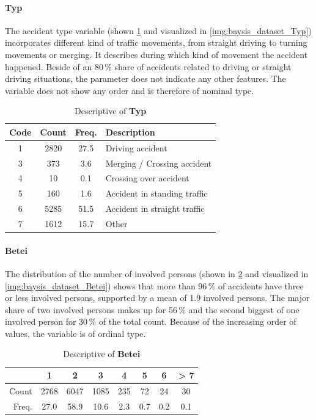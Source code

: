\paragraph{Typ}
\label{baysis_dataset_Typ}
The accident type variable (shown \cref{tbl:baysis_dataset_Typ} and visualized in \cref{img:baysis_dataset_Typ}) incorporates different kind of traffic movements, from straight driving to turning movements or merging. It describes during which kind of movement the accident happened. Beside of an 80\,\% share of accidents related to driving or straight driving situations, the parameter does not indicate any other features. The variable does not show any order and is therefore of nominal type.
\begin{table}[!ht]
	\centering
	\small
	\begin{tabular}{c|c|c|l} 
		\toprule
		Code & Count & Freq. & Description \\ 
		\midrule
 		1 & 2820	& 27.5	& Driving accident \\ 
 		3 & 373		& 3.6 	& Merging / Crossing accident \\
 		4 & 10		& 0.1	& Crossing over accident \\
 		5 & 160 	& 1.6	& Accident in standing traffic \\
 		6 & 5285	& 51.5	& Accident in straight traffic \\
		7 & 1612	& 15.7 	& Other \\
		\bottomrule
	\end{tabular}
	\caption{Descriptive of \textbf{Typ}}
	\label{tbl:baysis_dataset_Typ}
	\vspace{-8mm}
\end{table}
\paragraph{Betei}
\label{baysis_dataset_Betei}
The distribution of the number of involved persons (shown in \cref{tbl:baysis_dataset_Betei} and visualized in \cref{img:baysis_dataset_Betei}) shows that more than 96\,\% of accidents have three or less involved persons, supported by a mean of 1.9 involved persons. The major share of two involved persons makes up for 56\,\% and the second biggest of one involved person for 30\,\% of the total count. Because of the increasing order of values, the variable is of ordinal type.
\begin{table}[!ht]
	\centering
	\small
	\begin{tabular}{r|ccccccc} 
		\toprule
		 			& 1		& 2		& 3		& 4		& 5		& 6  	& > 7\\ 
		\midrule
 		Count 		& 2768	& 6047	& 1085	& 235	& 72 	& 24	& 30 \\ 
 		Freq. 	& 27.0	& 58.9	& 10.6 	& 2.3	& 0.7 	& 0.2 	& 0.1 \\
		\bottomrule
	\end{tabular}
	\caption{Descriptive of \textbf{Betei}}
	\label{tbl:baysis_dataset_Betei}
	\vspace{-8mm}
\end{table}
